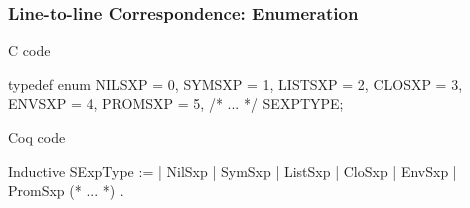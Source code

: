 \documentclass{beamer}
\begin{document}
\begin{frame}[fragile]
    \frametitle{Line-to-line Correspondence: Enumeration}

    \begin{minipage}{.45\textwidth}
        C code

\begin{ccode}
typedef enum {
    NILSXP  = 0,
    SYMSXP  = 1,
    LISTSXP = 2,
    CLOSXP  = 3,
    ENVSXP  = 4,
    PROMSXP = 5,
    /* ... */
} SEXPTYPE;
\end{ccode}

    \end{minipage}
    \qquad
    \begin{minipage}{.45\textwidth}
        Coq code

\begin{coqcode}
Inductive SExpType :=
  | NilSxp
  | SymSxp
  | ListSxp
  | CloSxp
  | EnvSxp
  | PromSxp
  (* ... *)
  .
\end{coqcode}

    \end{minipage}


\end{frame}
\end{document}
